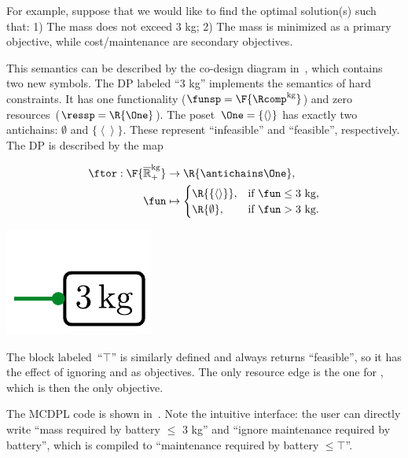 For example, suppose that we would like to find the optimal solution(s)
such that: 1) The mass does not exceed 3 kg; 2) The mass is minimized
as a primary objective, while cost/maintenance are secondary objectives.

This semantics can be described by the co-design diagram in~,
which contains two new symbols. The DP labeled ``3 kg'' implements
the semantics of hard constraints. It has one functionality ($\funsp=\F{\Rcomp^{\text{kg}}}$)
and zero resources~($\ressp=\R{\One}$). The poset~$\One=\{\left\langle \right\rangle \}$
has exactly two antichains: $\emptyset$ and $\{\left\langle \right\rangle \}$.
These represent ``infeasible'' and ``feasible'', respectively.
The DP is described by the map

\quad\quad
\begin{minipage}[c]{5cm}
\begin{align*}
\ftor:\F{\mathbb{\overline{R}}_{+}^{\text{kg}}} & \rightarrow\R{\antichains\One},\\
\fun & \mapsto\begin{cases}
\R{\{\left\langle \right\rangle \}}, & \text{if }\fun\leq\text{3 kg},\\
\R{\emptyset}, & \text{if }\fun>\text{3 kg}.
\end{cases}
\end{align*}

\end{minipage}\quad\includegraphics[scale=0.45]{batteries_3kg}

\smallskip{}

\noindent The block labeled~``$\top$'' is similarly defined and
always returns ``feasible'', so it has the effect of ignoring 
and  as objectives. The only resource edge is the
one for , which is then the only objective.

The MCDPL code is shown in~. Note the intuitive
interface: the user can directly write ``mass required by battery
$\leq$ 3 kg'' and ``ignore maintenance required by battery'',
which is compiled to ``maintenance required by battery $\leq\top$''.

